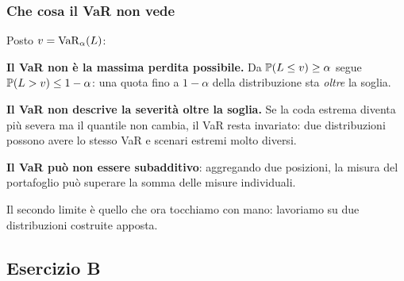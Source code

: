 \begin{frame}%
%

\frametitle{Che cosa il VaR non vede}%
%

%


Posto $v=\operatorname{VaR}_{\alpha}(L)$:

\medskip

\begin{stepitemize}
\item \textbf{Il VaR non \`{e} la massima perdita possibile.} Da $\mathbb{P}(L\leq
v)\geq\alpha$ segue $\mathbb{P}(L>v)\leq1-\alpha$: una quota fino a $1-\alpha$
della distribuzione sta \emph{oltre} la soglia.

\item \textbf{Il VaR non descrive la severit\`{a} oltre la soglia.} Se la coda
estrema diventa pi\`{u} severa ma il quantile non cambia, il VaR resta
invariato: due distribuzioni possono avere lo stesso VaR e scenari estremi
molto diversi.

\item \textbf{Il VaR pu\`{o} non essere subadditivo}: aggregando due
posizioni, la misura del portafoglio pu\`{o} superare la somma delle misure individuali.
\end{stepitemize}

\medskip

\begin{center}
{\small Il secondo limite \`{e} quello che ora tocchiamo con mano: lavoriamo
su due distribuzioni costruite apposta.}
\end{center}

%

\transboxout
\end{frame}%




\subsection{Esercizio B}%

